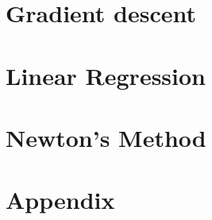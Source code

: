 \documentclass[11pt,twoside,a4paper]{book}
\begin{document}

\tableofcontents 
\chapter{Gradient descent} 


\chapter{Linear Regression}



\chapter{Newton's Method}





\chapter{Appendix}

\end{document}
